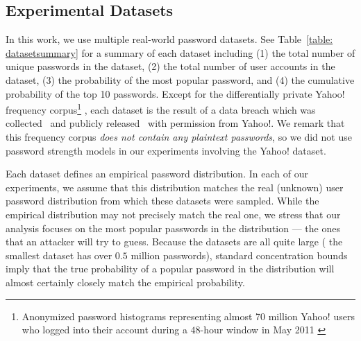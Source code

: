 \subsection{Experimental Datasets}\label{section:experiment:experiment_dataset} 
\vspace*{-\baselineskip}
In this work, we use multiple real-world password datasets. See Table~\ref{table: datasetsummary} for a summary of each dataset including (1) the total number of unique passwords in the dataset, (2) the total number of user accounts in the dataset, (3) the probability of the most popular password, and (4) the cumulative probability of the top 10 passwords. Except for the differentially private Yahoo! frequency corpus\footnote{Anonymized password histograms representing almost 70 million Yahoo! users who logged into their account during a $48$-hour window in May 2011 \cite{SP:Bonneau12}} , each dataset is the result of a data breach which was collected~\cite{SP:Bonneau12} and publicly released~\cite{NDSS:BloDatBon16} with permission from Yahoo!. We remark that this frequency corpus \textit{does not contain any plaintext passwords}, so we did not use password strength models in our experiments involving the Yahoo! dataset. %
 



Each dataset defines an empirical password distribution. In each of our experiments, we assume that this distribution matches the real (unknown) user password distribution from which these datasets were sampled. While the empirical distribution may not precisely match the real one, we stress that our analysis focuses on the most popular passwords in the distribution --- the ones that an attacker will try to guess. Because the datasets are all quite large ( the smallest dataset has over $0.5$ million passwords), standard concentration bounds imply that the true probability of a popular password in the distribution will almost certainly closely match the empirical probability.
\vspace*{-\baselineskip}


